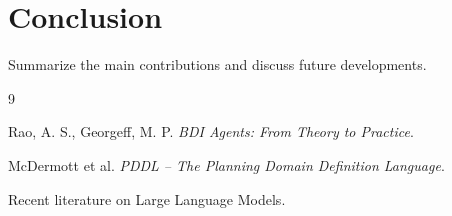 \documentclass[a4paper,11pt]{article}
\begin{document}
\section{Conclusion}

Summarize the main contributions and discuss future developments.


\begin{thebibliography}{9}

Rao, A. S., Georgeff, M. P.
\textit{BDI Agents: From Theory to Practice}.

McDermott et al.
\textit{PDDL -- The Planning Domain Definition Language}.

Recent literature on Large Language Models.

\end{thebibliography}
\end{document}

